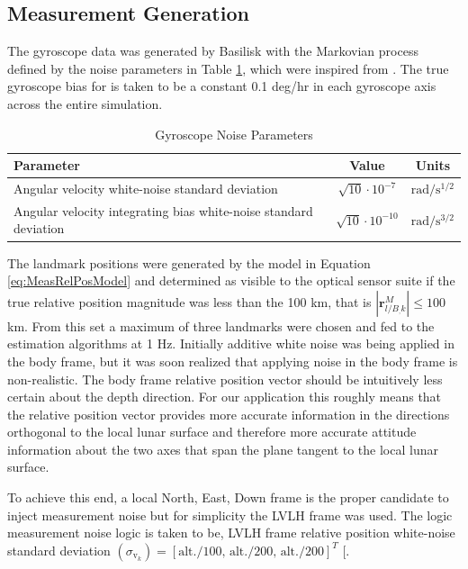 \documentclass[conf]{new-aiaa}
\newcommand{\vect}[1]{\mathbf{#1}}
\newcommand{\rlB}{\vect{r}^M_{l/B_,k}}
\begin{document}
\subsection{Measurement Generation}
The gyroscope data was generated by Basilisk with the Markovian process defined by the noise parameters in Table \ref{tab:gyro_noise_params}, which were inspired from \cite{crassidis2011optimal}. The true gyroscope bias for is taken to be a constant 0.1 deg/hr in each gyroscope axis across the entire simulation.

\begin{table}[h!]
\centering
\begin{tabular}{l c c}
\hline
\textbf{Parameter} & \textbf{Value} & \textbf{Units} \\
\hline
Angular velocity white-noise standard deviation 
& $\sqrt{10}\cdot10^{-7}$ 
& $\mathrm{rad/s^{1/2}}$ \\
Angular velocity integrating bias white-noise standard deviation 
& $\sqrt{10}\cdot10^{-10}$ 
& $\mathrm{rad/s^{3/2}}$ \\
\hline
\end{tabular}
\caption{Gyroscope Noise Parameters}
\label{tab:gyro_noise_params}
\end{table}




The landmark positions were generated by the model in Equation \ref{eq:MeasRelPosModel} and determined as visible to the optical sensor suite if the true relative position magnitude was less than the 100 km, that is $|\rlB| \leq 100$ km. From this set a maximum of three landmarks were chosen and fed to the estimation algorithms at 1 Hz.
Initially additive white noise was being applied in the body frame, but it was soon realized that applying noise in the body frame is non-realistic. The body frame relative position vector should be intuitively less certain about the depth direction. For our application this roughly means that the relative position vector provides more accurate information in the directions orthogonal to the local lunar surface and therefore more accurate attitude information about the two axes that span the plane tangent to the local lunar surface.

To achieve this end, a local North, East, Down frame is the proper candidate to inject measurement noise but for simplicity the LVLH frame was used. The logic measurement noise logic is taken to be, LVLH frame relative position white-noise standard deviation $(\sigma_{\mathrm{v}_k}) = [\text{alt./100, alt./200, alt./200}]^T$ [\text{km]}.
\end{document}
